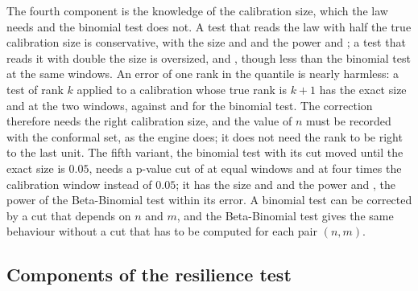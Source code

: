 The fourth component is the knowledge of the calibration size, which the law needs and the binomial test does not. A test that reads the law with half the true calibration size is conservative, with the size \CovSinHalfB{} and \CovSinHalfC{} and the power \CovPowHalfBTen{} and \CovPowHalfCTen{}; a test that reads it with double the size is oversized, \CovSinDoubleB{} and \CovSinDoubleC{}, though less than the binomial test at the same windows. An error of one rank in the quantile is nearly harmless: a test of rank $k$ applied to a calibration whose true rank is $k+1$ has the exact size \RankOffBBOne{} and \RankOffBBFour{} at the two windows, against \RankOffBinOne{} and \RankOffBinFour{} for the binomial test. The correction therefore needs the right calibration size, and the value of $n$ must be recorded with the conformal set, as the engine does; it does not need the rank to be right to the last unit. The fifth variant, the binomial test with its cut moved until the exact size is $0.05$, needs a p-value cut of \CovOracleCutB{} at equal windows and \CovOracleCutC{} at four times the calibration window instead of $0.05$; it has the size \CovSinOracleB{} and \CovSinOracleC{} and the power \CovPowOracleBTen{} and \CovPowOracleCTen{}, the power of the Beta-Binomial test within its error. A binomial test can be corrected by a cut that depends on $n$ and $m$, and the Beta-Binomial test gives the same behaviour without a cut that has to be computed for each pair $(n,m)$.

\subsection{Components of the resilience test}



